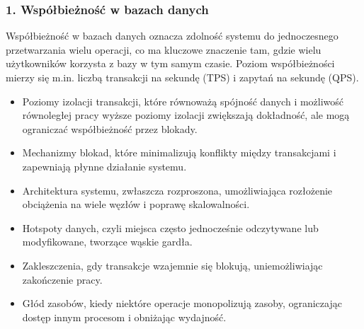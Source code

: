 \documentclass[a4paper,11pt,openany,english]{sphinxmanual}
\begin{document}
\subsubsection{1. Współbieżność w bazach danych}
\label{\detokenize{rozdzial2/Wydajnosc-Skalowanie-i-Replikacja/index:wspolbieznosc-w-bazach-danych}}
\sphinxAtStartPar
Współbieżność w bazach danych oznacza zdolność systemu do jednoczesnego przetwarzania wielu operacji, co ma kluczowe znaczenie tam, gdzie wielu użytkowników korzysta z bazy w tym samym czasie. Poziom współbieżności mierzy się m.in. liczbą transakcji na sekundę (TPS) i zapytań na sekundę (QPS).
\begin{description}
\begin{itemize}
\item {} 
\sphinxAtStartPar
Poziomy izolacji transakcji, które równoważą spójność danych i możliwość równoległej pracy \textendash{} wyższe poziomy izolacji zwiększają dokładność, ale mogą ograniczać współbieżność przez blokady.

\item {} 
\sphinxAtStartPar
Mechanizmy blokad, które minimalizują konflikty między transakcjami i zapewniają płynne działanie systemu.

\item {} 
\sphinxAtStartPar
Architektura systemu, zwłaszcza rozproszona, umożliwiająca rozłożenie obciążenia na wiele węzłów i poprawę skalowalności.

\end{itemize}

\begin{itemize}
\item {} 
\sphinxAtStartPar
Hotspoty danych, czyli miejsca często jednocześnie odczytywane lub modyfikowane, tworzące wąskie gardła.

\item {} 
\sphinxAtStartPar
Zakleszczenia, gdy transakcje wzajemnie się blokują, uniemożliwiając zakończenie pracy.

\item {} 
\sphinxAtStartPar
Głód zasobów, kiedy niektóre operacje monopolizują zasoby, ograniczając dostęp innym procesom i obniżając wydajność.

\end{itemize}

\end{description}
\end{document}
